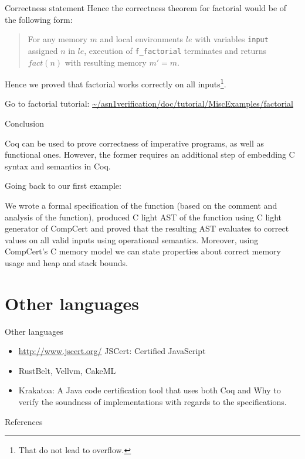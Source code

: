 \documentclass[10pt]{beamer}
\begin{document}
 \begin{frame}{Correctness statement}
    Hence the correctness theorem for factorial would be of the following form:
   \begin{quote}
     For any memory $m$ and local environments $le$ with variables \texttt{input} assigned $n$ in $le$, execution of \texttt{f\_factorial} terminates and returns $fact(n)$ with resulting memory $m' = m$.
   \end{quote}

   Hence we proved that factorial works correctly on all inputs\footnote{That do not lead to overflow.}.
      
      \end{frame}
    

    
    \begin{frame}
      Go to factorial tutorial: \url{~/asn1verification/doc/tutorial/MiscExamples/factorial}
    \end{frame}

    \begin{frame}{Conclusion}

      Coq can be used to prove correctness of imperative programs, as well as functional ones. However, the former requires an additional step of embedding C syntax and semantics in Coq. 
      
      Going back to our first example:
      
      We wrote a formal specification of the function (based on the comment and analysis of the function), produced C light AST of the function using C light generator of CompCert and proved that the resulting AST evaluates to correct values on all valid inputs using operational semantics. Moreover, using CompCert's C memory model we can state properties about correct memory usage and heap and stack bounds.
      
      \end{frame}

\section{Other languages}

\begin{frame}{Other languages}
 \begin{itemize}
  \item \url{http://www.jscert.org/} JSCert: Certified JavaScript

  \item RustBelt, Vellvm, CakeML
  \item Krakatoa: A Java code certification tool that uses both Coq and Why to verify the soundness of implementations with regards to the specifications.
  \end{itemize}
  \end{frame}

\begin{frame}[allowframebreaks]{References}

  
  

\end{frame}
\end{document}
